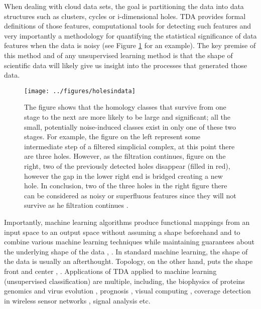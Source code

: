 \documentclass[onecollarge,runningheads]{svjour2}
\begin{document}
When dealing with cloud data sets, the goal is partitioning the data into data structures such as clusters, cycles or i-dimensional holes. TDA provides formal definitions of those features, computational tools for detecting such features and very importantly a methodology for quantifying the statistical significance of data features when the data is noisy (see Figure \ref{fig:holesindataset} for an example). The key premise of this method and of any unsupervised learning method is that the shape of scientific data will likely give us insight into the processes that generated those data.
\begin{figure}[h]
        \centering
        \texttt{[image: ../figures/holesindata]}
        \caption{The figure shows that the homology classes that survive from one stage to the next are more likely to be large and significant; all the small, potentially noise-induced classes exist in only one of these two stages. For example, the figure on the left represent some intermediate step of a filtered simplicial complex, at this point there are three holes. However, as the filtration continues, figure on the right, two of the previously detected holes disappear (filled in red), however the gap in the lower right end is bridged creating a new hole. In conclusion, two of the three holes in the right figure there can be considered as noisy or superfluous features since they will not survive  as he filtration continues \cite{tausz2012javaplex}.
       }
\label{fig:holesindataset}
\end{figure}

Importantly, machine learning algorithms produce functional mappings from an input space to an output space without assuming a shape beforehand and to combine various machine learning techniques while maintaining guarantees about the underlying shape of the data \cite{murphy2014machine}, \cite{lecun2015deep}. In standard machine learning, the shape of the data is usually an afterthought. Topology, on the other hand, puts the shape front and center \cite{rucco2014using}, \cite{patania2017topological}.
Applications of TDA applied to machine learning (unsupervised classification) are multiple, including, the biophysics of proteins \cite{gameiro2015topological} genomics and virus evolution \cite{chan2013topology}, prognosis \cite{schmidt2011disease}, visual computing \cite{bendich2010computing}, coverage detection in wireless sensor networks \cite{ghrist2005coverage}, signal analysis \cite{perea2015sliding} etc.
\end{document}
